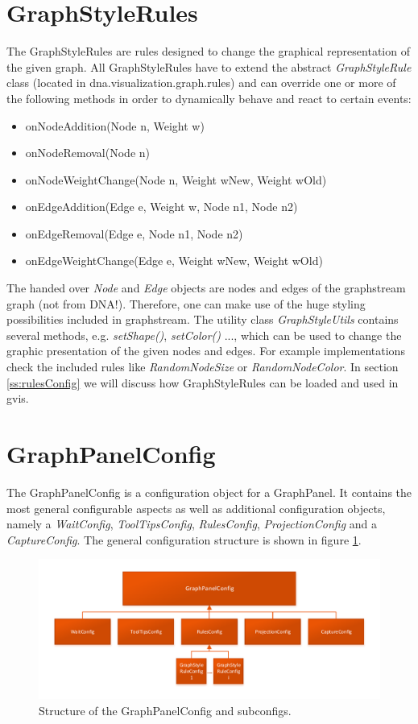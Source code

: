 \section{GraphStyleRules}
\label{s:graphStyleRules}
The GraphStyleRules are rules designed to change the graphical representation of the given graph. All GraphStyleRules have to extend the abstract \emph{GraphStyleRule} class (located in dna.visualization.graph.rules) and can override one or more of the following methods in order to dynamically behave and react to certain events:
\begin{itemize}
\item onNodeAddition(Node n, Weight w)
\item onNodeRemoval(Node n)
\item onNodeWeightChange(Node n, Weight wNew, Weight wOld)
\item onEdgeAddition(Edge e, Weight w, Node n1, Node n2)
\item onEdgeRemoval(Edge e, Node n1, Node n2)
\item onEdgeWeightChange(Edge e, Weight wNew, Weight wOld)
\end{itemize}
The handed over \emph{Node} and \emph{Edge} objects are nodes and edges of the graphstream graph (not from DNA!). Therefore, one can make use of the huge styling possibilities included in graphstream. The utility class \emph{GraphStyleUtils} contains several methods, e.g. \emph{setShape()}, \emph{setColor()} ..., which can be used to change the graphic presentation of the given nodes and edges. For example implementations check the included rules like \emph{RandomNodeSize} or \emph{RandomNodeColor}. In section \ref{ss:rulesConfig} we will discuss how GraphStyleRules can be loaded and used in gvis.


\section{GraphPanelConfig}
The GraphPanelConfig is a configuration object for a GraphPanel. It contains the most general configurable aspects as well as additional configuration objects, namely a \emph{WaitConfig}, \emph{ToolTipsConfig}, \emph{RulesConfig}, \emph{ProjectionConfig} and a \emph{CaptureConfig}. The general configuration structure is shown in figure \ref{fig:configstruct}.

\begin{figure} [h]
\centering
\includegraphics [scale=0.85] {images/configstructure.pdf}
\caption{Structure of the GraphPanelConfig and subconfigs.}
\label{fig:configstruct}
\end{figure}

